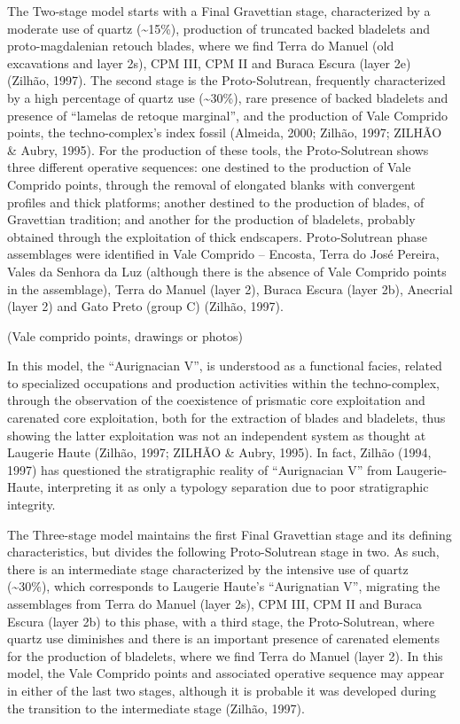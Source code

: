 \documentclass[12pt,twoside]{reedthesis}
\begin{document}
The Two-stage model starts with a Final Gravettian stage, characterized by a moderate use of quartz (\textasciitilde15\%), production of truncated backed bladelets and proto-magdalenian retouch blades, where we find Terra do Manuel (old excavations and layer 2s), CPM III, CPM II and Buraca Escura (layer 2e) (Zilhão, 1997). The second stage is the Proto-Solutrean, frequently characterized by a high percentage of quartz use (\textasciitilde30\%), rare presence of backed bladelets and presence of ``lamelas de retoque marginal'', and the production of Vale Comprido points, the techno-complex's index fossil (Almeida, 2000; Zilhão, 1997; ZILHÃO \& Aubry, 1995). For the production of these tools, the Proto-Solutrean shows three different operative sequences: one destined to the production of Vale Comprido points, through the removal of elongated blanks with convergent profiles and thick platforms; another destined to the production of blades, of Gravettian tradition; and another for the production of bladelets, probably obtained through the exploitation of thick endscapers. Proto-Solutrean phase assemblages were identified in Vale Comprido -- Encosta, Terra do José Pereira, Vales da Senhora da Luz (although there is the absence of Vale Comprido points in the assemblage), Terra do Manuel (layer 2), Buraca Escura (layer 2b), Anecrial (layer 2) and Gato Preto (group C) (Zilhão, 1997).

(Vale comprido points, drawings or photos)

In this model, the ``Aurignacian V'', is understood as a functional facies, related to specialized occupations and production activities within the techno-complex, through the observation of the coexistence of prismatic core exploitation and carenated core exploitation, both for the extraction of blades and bladelets, thus showing the latter exploitation was not an independent system as thought at Laugerie Haute (Zilhão, 1997; ZILHÃO \& Aubry, 1995). In fact, Zilhão (1994, 1997) has questioned the stratigraphic reality of ``Aurignacian V'' from Laugerie-Haute, interpreting it as only a typology separation due to poor stratigraphic integrity.

The Three-stage model maintains the first Final Gravettian stage and its defining characteristics, but divides the following Proto-Solutrean stage in two. As such, there is an intermediate stage characterized by the intensive use of quartz (\textasciitilde30\%), which corresponds to Laugerie Haute's ``Aurignatian V'', migrating the assemblages from Terra do Manuel (layer 2s), CPM III, CPM II and Buraca Escura (layer 2b) to this phase, with a third stage, the Proto-Solutrean, where quartz use diminishes and there is an important presence of carenated elements for the production of bladelets, where we find Terra do Manuel (layer 2). In this model, the Vale Comprido points and associated operative sequence may appear in either of the last two stages, although it is probable it was developed during the transition to the intermediate stage (Zilhão, 1997).
\end{document}
